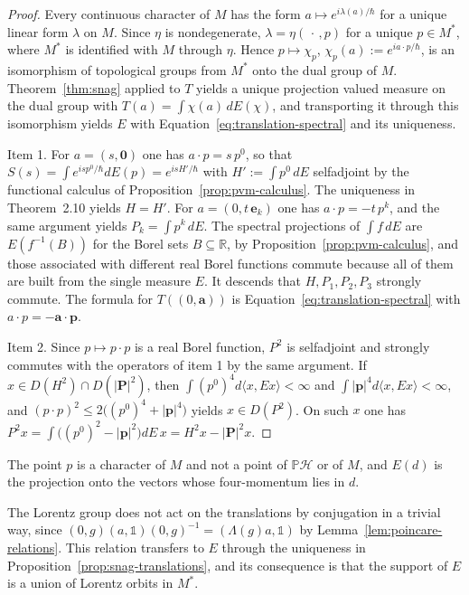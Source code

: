 \begin{proof}
	Every continuous character of $M$ has the form $a\mapsto e^{i\lambda(a)/\hbar}$ for a unique linear form $\lambda$ on $M$. Since $\eta$ is nondegenerate, $\lambda=\eta(\,\cdot\,,p)$ for a unique $p\in M^*$, where $M^*$ is identified with $M$ through $\eta$. Hence $p\mapsto\chi_p$, $\chi_p(a):=e^{ia\cdot p/\hbar}$, is an isomorphism of topological groups from $M^*$ onto the dual group of $M$. Theorem~\ref{thm:snag} applied to $T$ yields a unique projection valued measure on the dual group with $T(a)=\int\chi(a)\,dE(\chi)$, and transporting it through this isomorphism yields $E$ with Equation~\eqref{eq:translation-spectral} and its uniqueness.
	
	Item 1. For $a=(s,\mathbf{0})$ one has $a\cdot p=s\,p^0$, so that $S(s)=\int e^{isp^0/\hbar}dE(p)=e^{isH'/\hbar}$ with $H':=\int p^0\,dE$ selfadjoint by the functional calculus of Proposition~\ref{prop:pvm-calculus}. The uniqueness in Theorem~2.10 yields $H=H'$. For $a=(0,t\,\mathbf{e}_k)$ one has $a\cdot p=-t\,p^k$, and the same argument yields $P_k=\int p^k\,dE$. The spectral projections of $\int f\,dE$ are $E(f^{-1}(B))$ for the Borel sets $B\subseteq\mathbb{R}$, by Proposition~\ref{prop:pvm-calculus}, and those associated with different real Borel functions commute because all of them are built from the single measure $E$. It descends that $H,P_1,P_2,P_3$ strongly commute. The formula for $T((0,\mathbf{a}))$ is Equation~\eqref{eq:translation-spectral} with $a\cdot p=-\mathbf{a}\cdot\mathbf{p}$.
	
	Item 2. Since $p\mapsto p\cdot p$ is a real Borel function, $P^2$ is selfadjoint and strongly commutes with the operators of item 1 by the same argument. If $x\in D(H^2)\cap D(|\mathbf{P}|^2)$, then $\int(p^0)^4d\langle x,Ex\rangle<\infty$ and $\int|\mathbf{p}|^4d\langle x,Ex\rangle<\infty$, and $(p\cdot p)^2\leq2\big((p^0)^4+|\mathbf{p}|^4\big)$ yields $x\in D(P^2)$. On such $x$ one has $P^2x=\int\big((p^0)^2-|\mathbf{p}|^2\big)dE\,x=H^2x-|\mathbf{P}|^2x$.
\end{proof}

\noindent The point $p$ is a character of $M$ and not a point of $\mathbb{P}\mathcal{H}$ or of $M$, and $E(d)$ is the projection onto the vectors whose four-momentum lies in $d$.

The Lorentz group does not act on the translations by conjugation in a trivial way, since $(0,g)(a,\mathbb{1})(0,g)^{-1}=(\Lambda(g)a,\mathbb{1})$ by Lemma~\ref{lem:poincare-relations}. This relation transfers to $E$ through the uniqueness in Proposition~\ref{prop:snag-translations}, and its consequence is that the support of $E$ is a union of Lorentz orbits in $M^*$.

